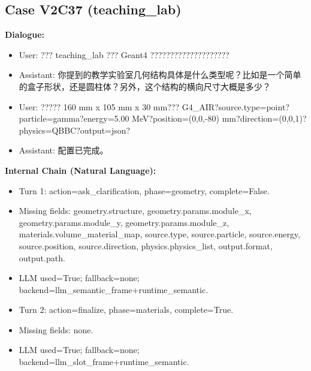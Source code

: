\documentclass[11pt]{ctexart}
\begin{document}
\subsection{Case V2C37 (teaching\_lab)}
\textbf{Dialogue:}
\begin{itemize}
\item User: ??? teaching\_lab ??? Geant4 ????????????????????
\item Assistant: 你提到的教学实验室几何结构具体是什么类型呢？比如是一个简单的盒子形状，还是圆柱体？另外，这个结构的横向尺寸大概是多少？
\item User: ????? 160 mm x 105 mm x 30 mm??? G4\_AIR?source.type=point?particle=gamma?energy=5.00 MeV?position=(0,0,-80) mm?direction=(0,0,1)?physics=QBBC?output=json?
\item Assistant: 配置已完成。
\end{itemize}
\textbf{Internal Chain (Natural Language):}
\begin{itemize}
\item Turn 1: action=ask\_clarification, phase=geometry, complete=False.
\item Missing fields: geometry.structure, geometry.params.module\_x, geometry.params.module\_y, geometry.params.module\_z, materials.volume\_material\_map, source.type, source.particle, source.energy, source.position, source.direction, physics.physics\_list, output.format, output.path.
\item LLM used=True; fallback=none; backend=llm\_semantic\_frame+runtime\_semantic.
\item Turn 2: action=finalize, phase=materials, complete=True.
\item Missing fields: none.
\item LLM used=True; fallback=none; backend=llm\_slot\_frame+runtime\_semantic.
\end{itemize}
\end{document}
